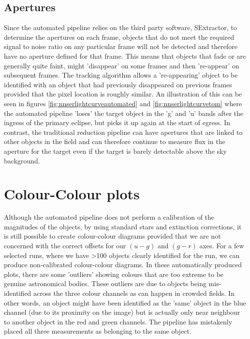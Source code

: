 \subsection{Apertures}
Since the automated pipeline relies on the third party software, SExtractor, to determine the apertures on each frame, objects that do not meet the required signal to noise ratio on any particular frame will not be detected and therefore have no aperture defined for that frame. This means that objects that fade or are generally quite faint, might 'disappear' on some frames and then 're-appear' on subsequent frames. The tracking algorithm allows a 're-appearing' object to be identified with an object that had previously disappeared on previous frames provided that the pixel location is roughly similar. An illustration of this can be seen in figures \ref{fig:nnserlightcurveautomated} and \ref{fig:nnserlightcurvetom} where the automated pipeline 'loses' the target object in the 'g' and 'u' bands after the ingress of the primary eclipse, but picks it up again at the start of egress. In contrast, the traditional reduction pipeline can have apertures that are linked to other objects in the field and can therefore continue to measure flux in the aperture for the target even if the target is barely detectable above the sky background.

\section{Colour-Colour plots}
Although the automated pipeline does not perform a calibration of the magnitudes of the objects, by using standard stars and extinction corrections, it is still possible to create colour-colour diagrams provided that we are not concerned with the correct offsets for our $(u-g)$ and $(g-r)$ axes. For a few selected runs, where we have \textgreater 100 objects clearly identified for the run, we can produce non-calibrated colour-colour diagrams. In these automatically produced plots, there are some 'outliers' showing colours that are too extreme to be genuine astronomical bodies. These outliers are due to objects being mis-identified across the three colour channels as can happen in crowded fields. In other words, an object might have been identified as the 'same' object in the blue channel (due to its proximity on the image) but is actually only near neighbour to another object in the red and green channels. The pipeline has mistakenly placed all three measurements as belonging to the same object. 

